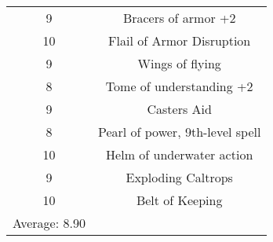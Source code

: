 \documentclass[letterpaper, 10pt]{article}
\begin{document}
\begin{center}
\begin{tabular}{|| c c ||}
    9  & Bracers of armor +2\\
    10 & Flail of Armor Disruption\\
    9  & Wings of flying\\
    8  & Tome of understanding +2\\
    9  & Casters Aid\\
    8  & Pearl of power, 9th-level spell\\
    10 & Helm of underwater action\\
    9  & Exploding Caltrops\\
    10 & Belt of Keeping \\
    \hline
    Average: 8.90 & \\
    \hline
    \hline
    \end{tabular}
\end{center}
\newpage
\end{document}
